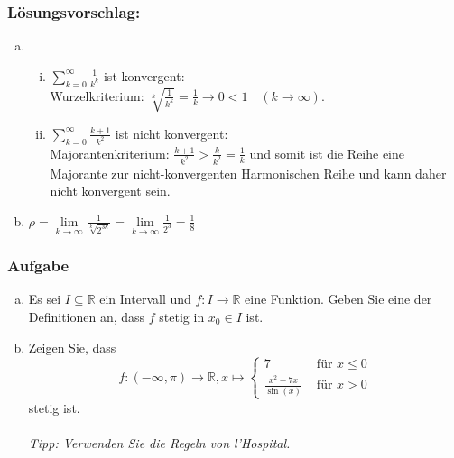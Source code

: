 \documentclass[a4paper,11pt]{scrartcl}
\newcounter{auf}
\newcommand{\Aufgabe}%
        {\addtocounter{auf}{1} \subsubsection*{\rmfamily  Aufgabe \theauf \hspace{1em}} }
\newcommand{\RR}{\mathbb{R}}
\begin{document}
\subsubsection*{Lösungsvorschlag:}
\begin{enumerate}[a)] 
\item
	\begin{enumerate}[i)]
	\item $\sum \limits_{k=0}^\infty \frac{1}{k^k}$ ist konvergent:\\
	Wurzelkriterium: $\sqrt[k]{\frac{1}{k^k}}=\frac{1}{k} \to 0<1 \quad (k \to \infty)$.
	
	\item $\sum \limits_{k=0}^\infty \frac{k+1}{k^2}$ ist nicht konvergent:\\
	Majorantenkriterium: $\frac{k+1}{k^2}>\frac{k}{k^2}=\frac{1}{k}$ und somit ist die Reihe eine Majorante zur nicht-konvergenten Harmonischen Reihe und kann daher nicht konvergent sein.
	\end{enumerate}
\item $\rho=\lim \limits_{k \to \infty} \frac{1}{\sqrt[k]{2^{3k}}}=\lim \limits_{k \to \infty} \frac{1}{2^3}=\frac{1}{8}$
\end{enumerate}

\newpage
\Aufgabe 
\begin{enumerate}[a)]
\item Es sei $I \subseteq \RR$ ein Intervall und $f:I \to \RR$ eine Funktion. Geben Sie eine der Definitionen an, dass $f$ stetig in $x_0 \in I$ ist.
\item Zeigen Sie, dass
$$
f: (-\infty, \pi) \to \RR, x \mapsto \begin{cases} 7 & \text{ für } x\le 0 \\ \frac{x^2+7x}{\sin(x)} & \text{ für } x>0 \end{cases}
$$
stetig ist.\\\quad\\
\textit{Tipp: Verwenden Sie die Regeln von l'Hospital.}
\end{enumerate}
\end{document}
